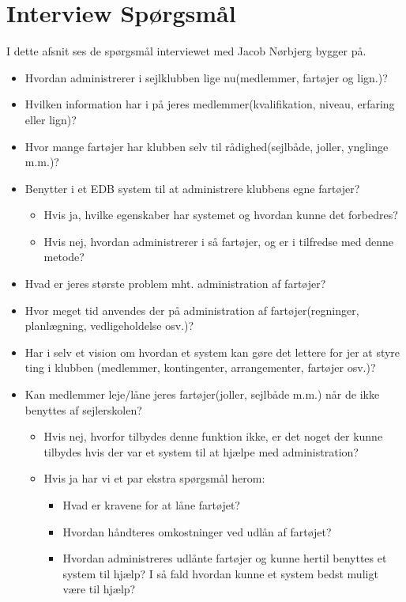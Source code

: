 \chapter{Interview Spørgsmål} \label{questions}
I dette afsnit ses de spørgsmål interviewet med Jacob Nørbjerg bygger på.

\begin{itemize}
\item Hvordan administrerer i sejlklubben lige nu(medlemmer, fartøjer og lign.)?
\item Hvilken information har i på jeres medlemmer(kvalifikation, niveau, erfaring eller lign)?
\item Hvor mange fartøjer har klubben selv til rådighed(sejlbåde, joller, ynglinge m.m.)?
\item Benytter i et EDB system til at administrere klubbens egne fartøjer?
	\begin{itemize}
	\item Hvis ja, hvilke egenskaber har systemet og hvordan kunne det forbedres?
	\item Hvis nej, hvordan administrerer i så fartøjer, og er i tilfredse med denne metode?
	\end{itemize}
\item Hvad er jeres største problem mht. administration af fartøjer?
\item Hvor meget tid anvendes der på administration af fartøjer(regninger, planlægning, vedligeholdelse osv.)?
\item Har i selv et vision om hvordan et system kan gøre det lettere for jer at styre ting i klubben (medlemmer, kontingenter, arrangementer, fartøjer osv.)?
\item Kan medlemmer leje/låne jeres fartøjer(joller, sejlbåde m.m.) når de ikke benyttes af sejlerskolen?
	\begin{itemize}
	\item Hvis nej, hvorfor tilbydes denne funktion ikke, er det noget der kunne tilbydes hvis der var et system til at hjælpe med administration?
	\item Hvis ja har vi et par ekstra spørgsmål herom:
		\begin{itemize}
		\item Hvad er kravene for at låne fartøjet?
		\item Hvordan håndteres omkostninger ved udlån af fartøjet?
		\item Hvordan administreres udlånte fartøjer og kunne hertil benyttes et system til hjælp? I så fald hvordan kunne et system bedst muligt være til hjælp?
		\end{itemize}
	\end{itemize}
\end{itemize}
